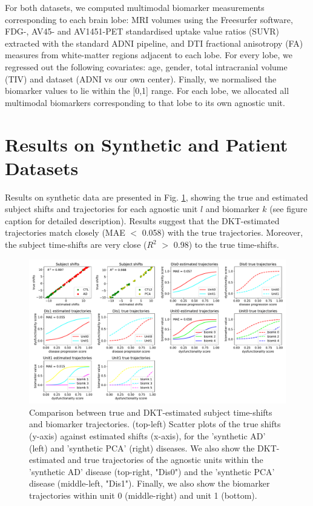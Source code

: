 \documentclass{llncs}
\begin{document}
For both datasets, we computed multimodal biomarker measurements corresponding to each brain lobe: MRI volumes using the Freesurfer software, FDG-, AV45- and AV1451-PET standardised uptake value ratios (SUVR) extracted with the standard ADNI pipeline, and DTI fractional anisotropy (FA) measures from white-matter regions adjacent to each lobe. For every lobe, we regressed out the following covariates: age, gender, total intracranial volume (TIV) and dataset (ADNI vs our own center). Finally, we normalised the biomarker values to lie within the [0,1] range. For each lobe, we allocated all multimodal biomarkers corresponding to that lobe to its own agnostic unit.


\section{Results on Synthetic and Patient Datasets}
\label{sec:dktRes}

Results on synthetic data are presented in Fig. \ref{fig:dktSynthTrajCompTrue}, showing the true and estimated subject shifts and trajectories for each agnostic unit $l$ and biomarker $k$ (see figure caption for detailed description). Results suggest that the DKT-estimated trajectories match closely (MAE $<$ 0.058) with the true trajectories. Moreover, the subject time-shifts are very close ($R^2$ $>$ 0.98) to the true time-shifts. 


\begin{figure}[htp]
\includegraphics[width=\textwidth]{compTrueParams101_synth1_JMD.pdf}
 \caption[DKT Simulation Results - Comparison between true and DKT-estimated biomarker trajectories and subject time-shifts.]{Comparison between true and DKT-estimated subject time-shifts and biomarker trajectories. (top-left) Scatter plots of the true shifts (y-axis) against estimated shifts (x-axis), for the 'synthetic AD' (left) and 'synthetic PCA' (right) diseases. We also show the DKT-estimated and true trajectories of the agnostic units within the 'synthetic AD' disease (top-right, "Dis0") and the 'synthetic PCA' disease (middle-left, "Dis1"). Finally, we also show the biomarker trajectories within unit 0 (middle-right) and unit 1 (bottom).}
  \label{fig:dktSynthTrajCompTrue}
\end{figure}
\end{document}
